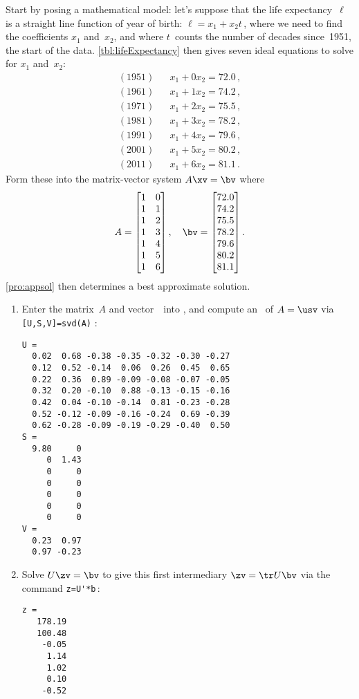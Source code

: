 \begin{example}
\begin{solution} 
Start by posing a mathematical model: let's suppose that the life expectancy~\(\ell\) is a straight line function of year of birth: \(\ell=x_1+x_2t\)\,, where we need to find the coefficients \(x_1\) and~\(x_2\), and where \(t\)~counts the number of decades since~1951, the start of the data.
\cref{tbl:lifeExpectancy} then gives seven ideal equations to solve for \(x_1\) and~\(x_2\):
\begin{eqnarray*}
(1951)&&x_1+0x_2=72.0\,,
\\(1961)&&x_1+1x_2=74.2\,,
\\(1971)&&x_1+2x_2=75.5\,,
\\(1981)&&x_1+3x_2=78.2\,,
\\(1991)&&x_1+4x_2=79.6\,,
\\(2001)&&x_1+5x_2=80.2\,,
\\(2011)&&x_1+6x_2=81.1\,.
\end{eqnarray*}
Form these into the matrix-vector system \(A\xv=\bv\) where
\begin{equation*}
A= \begin{bmatrix} 1&0\\1&1\\1&2\\1&3\\1&4\\1&5\\1&6 \end{bmatrix},
\quad \bv=\begin{bmatrix}72.0\\74.2\\75.5\\78.2\\79.6\\80.2\\81.1\end{bmatrix}.
\end{equation*}
\cref{pro:appsol} then determines a best approximate solution.
\begin{enumerate}
\item Enter the matrix~\(A\) and vector~\bv\ into \script, and compute an \svd\ of \(A=\usv\) via \verb|[U,S,V]=svd(A)| \twodp:
\setbox\ajrqrbox\hbox{}%
\marginajrbox%
\begin{verbatim}
U =
  0.02  0.68 -0.38 -0.35 -0.32 -0.30 -0.27
  0.12  0.52 -0.14  0.06  0.26  0.45  0.65
  0.22  0.36  0.89 -0.09 -0.08 -0.07 -0.05
  0.32  0.20 -0.10  0.88 -0.13 -0.15 -0.16
  0.42  0.04 -0.10 -0.14  0.81 -0.23 -0.28
  0.52 -0.12 -0.09 -0.16 -0.24  0.69 -0.39
  0.62 -0.28 -0.09 -0.19 -0.29 -0.40  0.50
S =
  9.80     0
     0  1.43
     0     0
     0     0
     0     0
     0     0
     0     0
V =
  0.23  0.97
  0.97 -0.23
\end{verbatim}
\item Solve \(U\zv=\bv\) to give this first intermediary \(\zv=\tr U\bv\) via the command \verb|z=U'*b|\,:
\begin{verbatim}
z =
   178.19
   100.48
    -0.05
     1.14
     1.02
     0.10
    -0.52
\end{verbatim}


\end{enumerate}
\end{solution}
\end{example}
